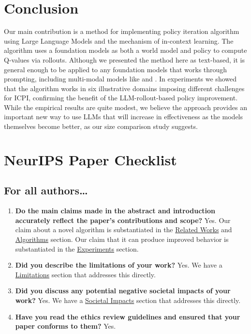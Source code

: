 \documentclass{article}
\begin{document}
\section{Conclusion}
Our main contribution is a method for implementing policy iteration algorithm
using Large Language Models and the mechanism of in-context learning. The
algorithm uses a foundation models as both a world model and policy to compute
Q-values via rollouts. Although we presented the method here as text-based, it
is general enough to be applied to any foundation models that works through
prompting, including multi-modal models like \cite{reed_generalist_2022} and
\cite{seo_harp_2022}. In experiments we showed that the algorithm works in six
illustrative domains imposing different challenges for ICPI, confirming the
benefit of the LLM-rollout-based policy improvement. While the empirical results
are quite modest, we believe the approach provides an important new way to use
LLMs that will increase in effectiveness as the models themselves become better,
as our size comparison study suggests.
\newpage
\section{NeurIPS Paper Checklist}
\subsection{For all authors\dots}
\begin{enumerate}
  \item \textbf{Do the main claims made in the abstract and introduction accurately reflect the paper's contributions and scope?}
        Yes. Our claim about a novel algorithm is substantiated in the \hyperref[sec:related]{Related Works} and \hyperref[sec:algorithms]{Algorithms} section. Our claim that it can produce improved behavior is substantiated in the \hyperref[sec:experiments]{Experiments} section.
  \item \textbf{Did you describe the limitations of your work?}
        Yes. We have a \hyperref[para:limitations]{Limitations} section that addresses this directly.
  \item \textbf{Did you discuss any potential negative societal impacts of your work?}
        Yes. We have a \hyperref[para:impacts]{Societal Impacts} section that addresses this directly.
  \item \textbf{Have you read the ethics review guidelines and ensured that your paper conforms to them?} Yes.
\end{enumerate}
\end{document}
